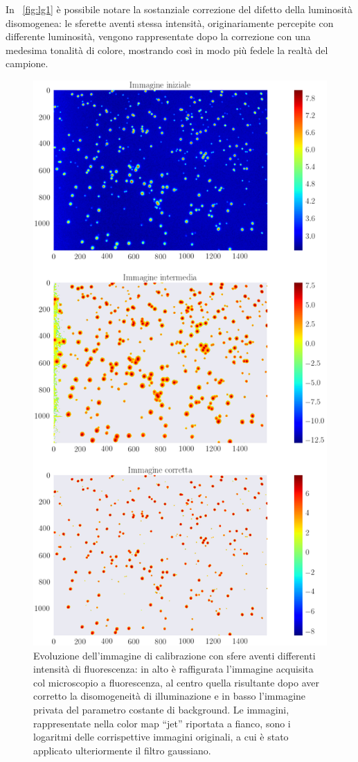 In \figurename~\ref{fig:lg1} è possibile notare la sostanziale correzione del difetto della luminosità disomogenea: le sferette aventi stessa intensità, originariamente percepite con differente luminosità, vengono rappresentate dopo la correzione con una medesima tonalità di colore, mostrando così in modo più fedele la realtà del campione.

\begin{figure}
 \centering
 \includegraphics[scale=.50]{img/CAP4lg2.png}
 \caption{\small{Evoluzione dell'immagine di calibrazione con sfere aventi differenti intensità di fluorescenza: in alto è raffigurata l'immagine acquisita col microscopio a fluorescenza, al centro quella risultante dopo aver corretto la disomogeneità di illuminazione e in basso l'immagine privata del parametro costante di background. Le immagini, rappresentate nella color map ``jet'' riportata a fianco, sono i logaritmi delle corrispettive immagini originali, a cui è stato applicato ulteriormente il filtro gaussiano.}}
 \label{fig:lg2}
\end{figure}

